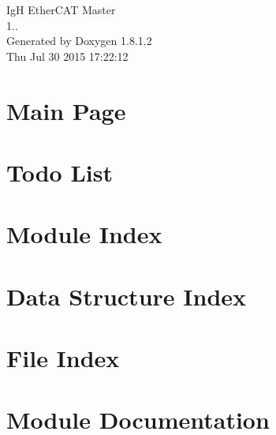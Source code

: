 \documentclass{book}
\begin{document}
\begin{titlepage}
\vspace*{7cm}
\begin{center}
{\Large Ig\-H Ether\-C\-A\-T Master \\[1ex]\large 1.. }\\
\vspace*{1cm}
{\large Generated by Doxygen 1.8.1.2}\\
\vspace*{0.5cm}
{\small Thu Jul 30 2015 17:22:12}\\
\end{center}
\end{titlepage}
\clearemptydoublepage
{}
\tableofcontents
\clearemptydoublepage
{}
\chapter{Main Page}
\label{index}
\chapter{Todo List}
\label{todo}

\chapter{Module Index}

\chapter{Data Structure Index}

\chapter{File Index}

\chapter{Module Documentation}



\end{document}
